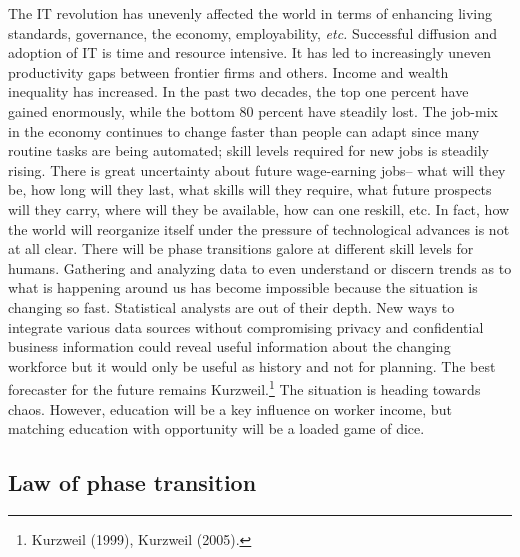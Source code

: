 \begin{multicols}{2}
The IT revolution has unevenly affected the world in terms of enhancing living standards, governance, the economy, employability, \textit{etc.} Successful diffusion and adoption of IT is time and resource intensive. It has led to increasingly uneven productivity gaps between frontier firms and others. Income and wealth inequality has increased. In the past two decades, the top one percent have gained enormously, while the bottom 80 percent have steadily lost. The job-mix in the economy continues to change faster than people can adapt since many routine tasks are being automated; skill levels required for new jobs is steadily rising. There is great uncertainty about future wage-earning jobs-- what will they be, how long will they last, what skills will they require, what future prospects will they carry, where will they be available, how can one reskill, etc. In fact, how the world will reorganize itself under the pressure of technological advances is not at all clear. There will be phase transitions galore at different skill levels for humans. Gathering and analyzing data to even understand or discern trends as to what is happening around us has become impossible because the situation is changing so fast. Statistical analysts are out of their depth. New ways to integrate various data sources without compromising privacy and confidential business information could reveal useful information about the changing workforce but it would only be useful as history and not for planning. The best forecaster for the future remains Kurzweil.\footnote{Kurzweil (1999), Kurzweil (2005).} The situation is heading towards chaos. However, education will be a key influence on worker income, but matching education with opportunity will be a loaded game of dice.

\subsection{Law of phase transition}


\end{multicols}
